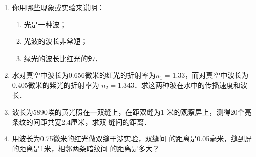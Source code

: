 \begin{enumerate}
    \item 你用哪些现象或实验来说明：
    \begin{enumerate}
        \item 光是一种波；
        \item 光波的波长非常短；
        \item 绿光的波长比红光的短．
    \end{enumerate}
    \item 水对真空中波长为0.656微米的红光的折射率为$n_1
    =1.33$，而对真空中波长为0.405微米的紫光的折射率为
    $n_2=1.343$．求这两种波在水中的传播速度和波长．
    \item 波长为5890埃的黄光照在一双缝上，在距双缝为1
    米的观察屏上，测得20个亮条纹的间距共宽2.4厘米，求双
    缝间的距离．
    \item 用波长为0.75微米的红光做双缝干涉实验，双缝间
    的距离是0.05毫米，缝到屏的距离是1米，相邻两条暗纹间
    的距离是多大？
\end{enumerate}








